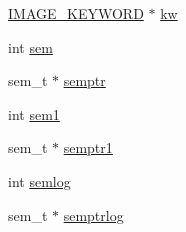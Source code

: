 \begin{DoxyCompactItemize}
\begin{tabbing}
\end{tabbing}\item 
\hyperlink{structIMAGE__KEYWORD}{I\+M\+A\+G\+E\+\_\+\+K\+E\+Y\+W\+O\+R\+D} $\ast$ \hyperlink{structIMAGE_aeec1ba7287c93dc589e38c4b1479b967}{kw}
\item 
int \hyperlink{structIMAGE_a6a50020081f8e319972497690237fb66}{sem}
\item 
sem\+\_\+t $\ast$ \hyperlink{structIMAGE_a834b3af28769972547e952466d8bb559}{semptr}
\item 
int \hyperlink{structIMAGE_aff137290d0abaaa812c25d1e691a0c96}{sem1}
\item 
sem\+\_\+t $\ast$ \hyperlink{structIMAGE_a11dc5725b81107fc432e8e1f80ca5704}{semptr1}
\item 
int \hyperlink{structIMAGE_a6ae15b91c6c2c32555c3254cd292c6ef}{semlog}
\item 
sem\+\_\+t $\ast$ \hyperlink{structIMAGE_af1f06c3f32f7534b6c695520be4ec5be}{semptrlog}
\end{DoxyCompactItemize}


